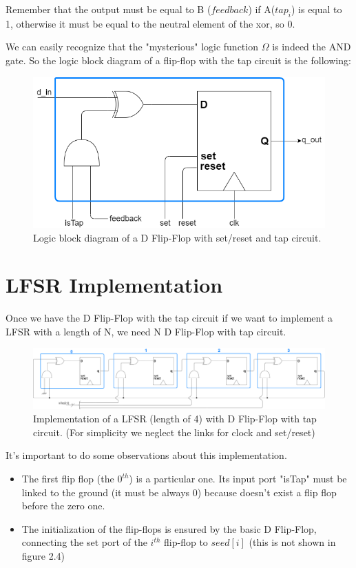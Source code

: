 \documentclass[a4paper]{report}
\begin{document}
\noindent Remember that the output must be equal to B ($feedback$) if A($tap_i$) is equal to 1, otherwise it must be equal to the neutral element of the xor, so 0.

\noindent We can easily recognize that the "mysterious" logic function $\Omega$ is indeed the AND gate.
So the logic block diagram of a flip-flop with the tap circuit is the following:
\begin{figure}[htpb]
	\centering
	\includegraphics[scale=0.6]{img/FF_tap_circuit.png}
	\caption{Logic block diagram of a D Flip-Flop with set/reset and tap circuit.}
\end{figure}

\section{LFSR Implementation}
Once we have the D Flip-Flop with the tap circuit if we want to implement a LFSR with a length of N, we need N D Flip-Flop with tap circuit.
\begin{figure}[htpb]
	\centering
	\includegraphics[scale=0.19]{img/LFSR_logic_block.png}
	\caption{Implementation of a LFSR (length of 4) with D Flip-Flop with tap circuit. (For simplicity we neglect the links for clock and set/reset)}
\end{figure}

\noindent It's important to do some observations about this implementation.
\begin{itemize}
	\item The first flip flop (the $0^{th}$) is a particular one. Its input port "isTap" must be linked to the ground (it must be always 0) because doesn't exist a flip flop before the zero one.
	\item The initialization of the flip-flops is ensured by the basic D Flip-Flop, connecting the set port of the $i^{th}$ flip-flop to $seed[i]$ (this is not shown in figure 2.4)
\end{itemize}
\end{document}
